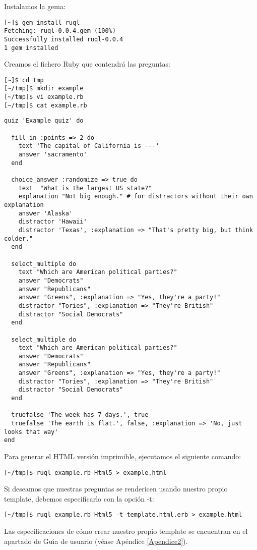 Instalamos la gema:

\begin{verbatim}
[~]$ gem install ruql
Fetching: ruql-0.0.4.gem (100%)
Successfully installed ruql-0.0.4
1 gem installed
\end{verbatim}

Creamos el fichero Ruby que contendr\'a las preguntas:

\begin{verbatim}
[~]$ cd tmp
[~/tmp]$ mkdir example
[~/tmp]$ vi example.rb
[~/tmp]$ cat example.rb 
\end{verbatim}

\begin{lstlisting}
quiz 'Example quiz' do
  
  fill_in :points => 2 do
    text 'The capital of California is ---'
    answer 'sacramento'
  end
  
  choice_answer :randomize => true do
    text  "What is the largest US state?"
    explanation "Not big enough." # for distractors without their own explanation
    answer 'Alaska'
    distractor 'Hawaii'
    distractor 'Texas', :explanation => "That's pretty big, but think colder."
  end
  
  select_multiple do
    text "Which are American political parties?"
    answer "Democrats"
    answer "Republicans"
    answer "Greens", :explanation => "Yes, they're a party!"
    distractor "Tories", :explanation => "They're British"
    distractor "Social Democrats"
  end
  
  select_multiple do
    text "Which are American political parties?"
    answer "Democrats"
    answer "Republicans"
    answer "Greens", :explanation => "Yes, they're a party!"
    distractor "Tories", :explanation => "They're British"
    distractor "Social Democrats"
  end
  
  truefalse 'The week has 7 days.', true
  truefalse 'The earth is flat.', false, :explanation => 'No, just looks that way'
end
\end{lstlisting}
\bigskip

Para generar el HTML versi\'on imprimible, ejecutamos el siguiente comando:

\begin{verbatim}
[~/tmp]$ ruql example.rb Html5 > example.html
\end{verbatim}

Si deseamos que nuestras preguntas se rendericen usando nuestro propio template, debemos especificarlo con la opci\'on -t:

\begin{verbatim}
[~/tmp]$ ruql example.rb Html5 -t template.html.erb > example.html
\end{verbatim}

Las especificaciones de c\'omo crear nuestro propio template se encuentran en el apartado de Gu\'{\i}a de usuario (v\'ease Ap\'endice \ref{Apendice2}).